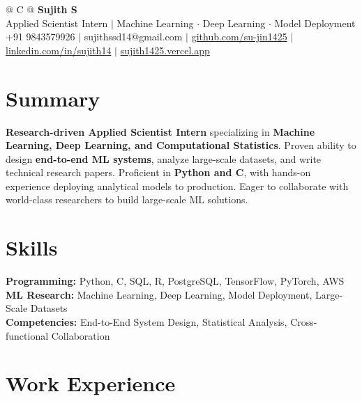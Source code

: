 \documentclass[a4paper,11pt]{article}
\newcommand{\ulink}[2]{\href{#1}{#2}}
\begin{document}
\pagestyle{empty}

\begin{tabularx}{\linewidth}{@{} C @{}}
{\color[HTML]{000000}\fontsize{30}{35}\selectfont\bfseries Sujith S} \\[5pt]
{\fontsize{10.5}{12.5}\selectfont\color[HTML]{3A3A3A}
Applied Scientist Intern $|$ Machine Learning $\cdot$ Deep Learning $\cdot$ Model Deployment} \\[6pt]
{\fontsize{9.5}{11.5}\selectfont\textcolor[HTML]{3A3A3A}{+91 9843579926 $|$ sujithssd14@gmail.com $|$ \ulink{https://github.com/su-jin1425}{github.com/su-jin1425} $|$ \ulink{https://linkedin.com/in/sujith14}{linkedin.com/in/sujith14} $|$ \ulink{https://sujith1425.vercel.app}{sujith1425.vercel.app}}}
\end{tabularx}

\section{Summary}
\vspace{2pt}

{\color[HTML]{0A0A0A}\fontsize{11}{14}\selectfont
\textbf{Research-driven Applied Scientist Intern} specializing in \textbf{Machine Learning, Deep Learning, and Computational Statistics}. Proven ability to design \textbf{end-to-end ML systems}, analyze large-scale datasets, and write technical research papers. Proficient in \textbf{Python and C}, with hands-on experience deploying analytical models to production. Eager to collaborate with world-class researchers to build large-scale ML solutions.}

\section{Skills}
\vspace{2pt}

{\color[HTML]{0A0A0A}\fontsize{11}{14}\selectfont
\textbf{Programming:} Python, C, SQL, R, PostgreSQL, TensorFlow, PyTorch, AWS \\[2pt]
\textbf{ML Research:} Machine Learning, Deep Learning, Model Deployment, Large-Scale Datasets \\[2pt]
\textbf{Competencies:} End-to-End System Design, Statistical Analysis, Cross-functional Collaboration}

\section{Work Experience}
\vspace{2pt}
\end{document}
